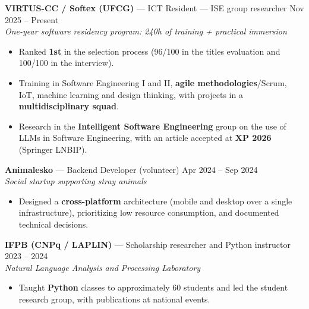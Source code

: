 \documentclass[10.5pt,a4paper]{article}
\newcommand{\cargo}[4]{%
  \Needspace*{5\baselineskip}%
  \textbf{#1} \textnormal{---} #2 \hfill \textnormal{#3}\\
  \textit{\small #4}\vspace{0.4ex}
}
\begin{document}
\cargo{VIRTUS-CC / Softex (UFCG)}{ICT Resident --- ISE group researcher}{Nov 2025 --
Present}{One-year software residency program: 240h of training + practical immersion}
\begin{itemize}
  \item Ranked \textbf{1st} in the selection process (96/100 in the titles evaluation and 100/100
        in the interview).
  \item Training in Software Engineering I and II, \textbf{agile methodologies}/Scrum, IoT,
        machine learning and design thinking, with projects in a \textbf{multidisciplinary squad}.
  \item Research in the \textbf{Intelligent Software Engineering} group on the use of LLMs in
        Software Engineering, with an article accepted at \textbf{XP 2026} (Springer LNBIP).
\end{itemize}

\cargo{Animalesko}{Backend Developer (volunteer)}{Apr 2024 -- Sep 2024}{Social startup supporting
stray animals}
\begin{itemize}
  \item Designed a \textbf{cross-platform} architecture (mobile and desktop over a single
        infrastructure), prioritizing low resource consumption, and documented technical decisions.
\end{itemize}

\cargo{IFPB (CNPq / LAPLIN)}{Scholarship researcher and Python instructor}{2023 -- 2024}{Natural
Language Analysis and Processing Laboratory}
\begin{itemize}
  \item Taught \textbf{Python} classes to approximately 60 students and led the student research
        group, with publications at national events.
\end{itemize}

\end{document}

